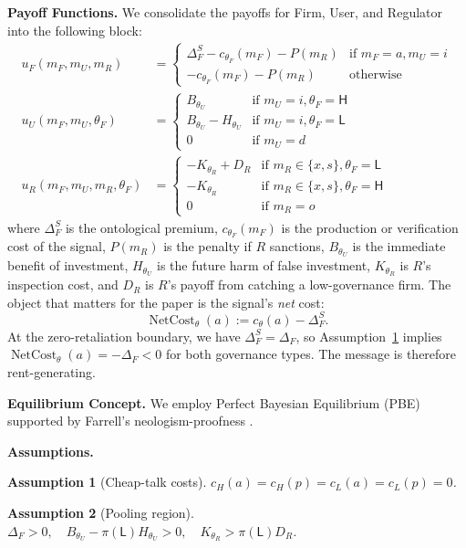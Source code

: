 \documentclass[review,authoryear]{elsarticle}
\newtheorem{assumption}{Assumption}
\theoremstyle{definition}
\theoremstyle{plain}
\begin{document}
\textbf{Payoff Functions.} 
We consolidate the payoffs for Firm, User, and Regulator into the following block:
\begin{align*}
u_F(m_F, m_U, m_R) &= 
\begin{cases}
\Delta_F^S - c_{\theta_F}(m_F) - P(m_R) & \text{if } m_F=a, m_U=i \\
- c_{\theta_F}(m_F) - P(m_R) & \text{otherwise}
\end{cases} \\
u_U(m_F, m_U, \theta_F) &= 
\begin{cases}
B_{\theta_U} & \text{if } m_U=i, \theta_F=\mathsf{H} \\
B_{\theta_U} - H_{\theta_U} & \text{if } m_U=i, \theta_F=\mathsf{L} \\
0 & \text{if } m_U=d
\end{cases} \\
u_R(m_F, m_U, m_R, \theta_F) &=
\begin{cases}
-K_{\theta_R} + D_R & \text{if } m_R \in \{x,s\}, \theta_F=\mathsf{L} \\
-K_{\theta_R} & \text{if } m_R \in \{x,s\}, \theta_F=\mathsf{H} \\
0 & \text{if } m_R = o
\end{cases}
\end{align*}
where $\Delta_F^S$ is the ontological premium, $c_{\theta_F}(m_F)$ is the production or verification cost of the signal, $P(m_R)$ is the penalty if $R$ sanctions, $B_{\theta_U}$ is the immediate benefit of investment, $H_{\theta_U}$ is the future harm of false investment, $K_{\theta_R}$ is $R$'s inspection cost, and $D_R$ is $R$'s payoff from catching a low-governance firm.  The object that matters for the paper is the signal's \emph{net} cost:
\[
\operatorname{NetCost}_{\theta}(a)
:=
c_{\theta}(a)-\Delta_F^S .
\]
At the zero-retaliation boundary, we have $\Delta_F^S=\Delta_F$, so Assumption~\ref{ass:cheap-talk} implies $\operatorname{NetCost}_{\theta}(a)=-\Delta_F<0$ for both governance types. The message is therefore rent-generating.

\textbf{Equilibrium Concept.} We employ Perfect Bayesian Equilibrium (PBE) \citep{kreps_wilson1982} supported by Farrell's neologism-proofness \citep{farrell1993}.

\textbf{Assumptions.}
\begin{assumption}[Cheap-talk costs]
\label{ass:cheap-talk}
$c_H(a)=c_H(p)=c_L(a)=c_L(p)=0$.
\end{assumption}
\begin{assumption}[Pooling region]
\label{ass:pooling}
$\Delta_F > 0, \quad B_{\theta_U} - \pi(\mathsf{L})H_{\theta_U} > 0, \quad K_{\theta_R} > \pi(\mathsf{L})D_R$.
\end{assumption}
\end{document}
